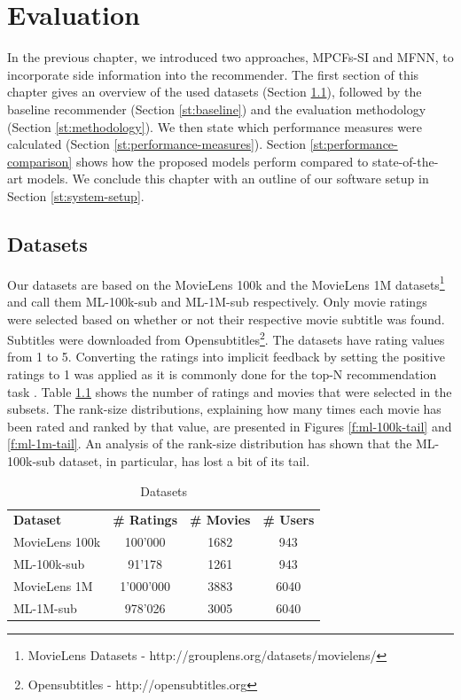 \chapter{Evaluation}
\label{c:evaluation}

In the previous chapter, we introduced two approaches, MPCFs-SI and MFNN, to incorporate side information into the recommender.
The first section of this chapter gives an overview of the used datasets (Section \ref{st:datasets}), followed by the baseline recommender (Section \ref{st:baseline}) and the evaluation methodology (Section \ref{st:methodology}).
We then state which performance measures were calculated (Section \ref{st:performance-measures}).
Section \ref{st:performance-comparison} shows how the proposed models perform compared to state-of-the-art models.
We conclude this chapter with an outline of our software setup in Section \ref{st:system-setup}.

\section{Datasets}
\label{st:datasets}
Our datasets are based on the MovieLens 100k and the MovieLens 1M datasets\footnote{MovieLens Datasets - http://grouplens.org/datasets/movielens/} and call them ML-100k-sub and ML-1M-sub respectively.
Only movie ratings were selected based on whether or not their respective movie subtitle was found.
Subtitles were downloaded from Opensubtitles\footnote{Opensubtitles - http://opensubtitles.org}.
The datasets have rating values from 1 to 5.
Converting the ratings into implicit feedback by setting the positive ratings to 1 was applied as it is commonly done for the top-N recommendation task \cite{Kabbur2015}.
Table \ref{tab:datasets} shows the number of ratings and movies that were selected in the subsets.
The rank-size distributions, explaining how many times each movie has been rated and ranked by that value, are presented in Figures \ref{f:ml-100k-tail} and \ref{f:ml-1m-tail}.
An analysis of the rank-size distribution has shown that the ML-100k-sub dataset, in particular, has lost a bit of its tail.

\begin{table}[h]
	\begin{center}
		\begin{tabularx}{\linewidth}{Xccc}
			\hline \hline
			\textbf{Dataset} & \textbf{\# Ratings} & \textbf{\# Movies} & \textbf{\# Users} \\
			MovieLens 100k & 100'000 & 1682 & 943 \\
			ML-100k-sub & 91'178 & 1261 & 943 \\
			MovieLens 1M & 1'000'000 & 3883 & 6040 \\
			ML-1M-sub & 978'026 & 3005 & 6040 \\
			\hline \hline
		\end{tabularx}
	\end{center}
	\caption{Datasets}
	\label{tab:datasets}
\end{table}

